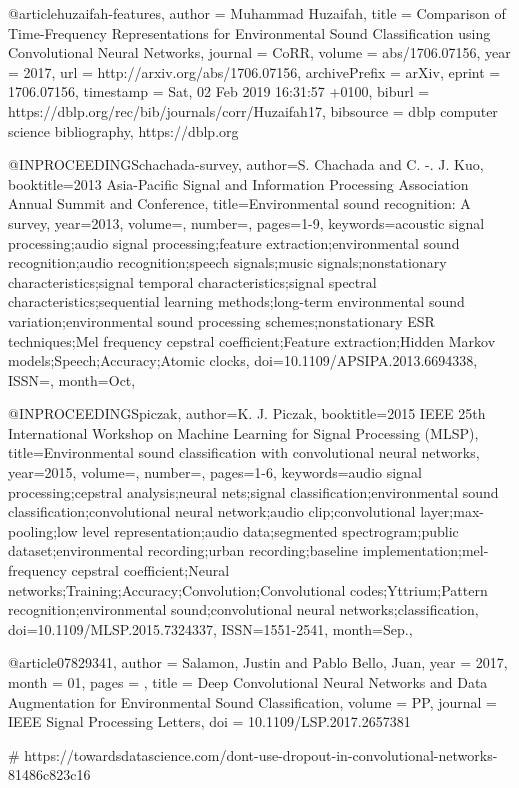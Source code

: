 @article{huzaifah-features,
  author    = {Muhammad Huzaifah},
  title     = {Comparison of Time-Frequency Representations for Environmental Sound
               Classification using Convolutional Neural Networks},
  journal   = {CoRR},
  volume    = {abs/1706.07156},
  year      = {2017},
  url       = {http://arxiv.org/abs/1706.07156},
  archivePrefix = {arXiv},
  eprint    = {1706.07156},
  timestamp = {Sat, 02 Feb 2019 16:31:57 +0100},
  biburl    = {https://dblp.org/rec/bib/journals/corr/Huzaifah17},
  bibsource = {dblp computer science bibliography, https://dblp.org}
}


@INPROCEEDINGS{chachada-survey,
author={S. {Chachada} and C. -. J. {Kuo}},
booktitle={2013 Asia-Pacific Signal and Information Processing Association Annual Summit and Conference},
title={Environmental sound recognition: A survey},
year={2013},
volume={},
number={},
pages={1-9},
keywords={acoustic signal processing;audio signal processing;feature extraction;environmental sound recognition;audio recognition;speech signals;music signals;nonstationary characteristics;signal temporal characteristics;signal spectral characteristics;sequential learning methods;long-term environmental sound variation;environmental sound processing schemes;nonstationary ESR techniques;Mel frequency cepstral coefficient;Feature extraction;Hidden Markov models;Speech;Accuracy;Atomic clocks},
doi={10.1109/APSIPA.2013.6694338},
ISSN={},
month={Oct},}



@INPROCEEDINGS{piczak,
author={K. J. {Piczak}},
booktitle={2015 IEEE 25th International Workshop on Machine Learning for Signal Processing (MLSP)},
title={Environmental sound classification with convolutional neural networks},
year={2015},
volume={},
number={},
pages={1-6},
keywords={audio signal processing;cepstral analysis;neural nets;signal classification;environmental sound classification;convolutional neural network;audio clip;convolutional layer;max-pooling;low level representation;audio data;segmented spectrogram;public dataset;environmental recording;urban recording;baseline implementation;mel-frequency cepstral coefficient;Neural networks;Training;Accuracy;Convolution;Convolutional codes;Yttrium;Pattern recognition;environmental sound;convolutional neural networks;classification},
doi={10.1109/MLSP.2015.7324337},
ISSN={1551-2541},
month={Sep.},}


@article{07829341,
author = {Salamon, Justin and Pablo Bello, Juan},
year = {2017},
month = {01},
pages = {},
title = {Deep Convolutional Neural Networks and Data Augmentation for Environmental Sound Classification},
volume = {PP},
journal = {IEEE Signal Processing Letters},
doi = {10.1109/LSP.2017.2657381}
}


# https://towardsdatascience.com/dont-use-dropout-in-convolutional-networks-81486c823c16

